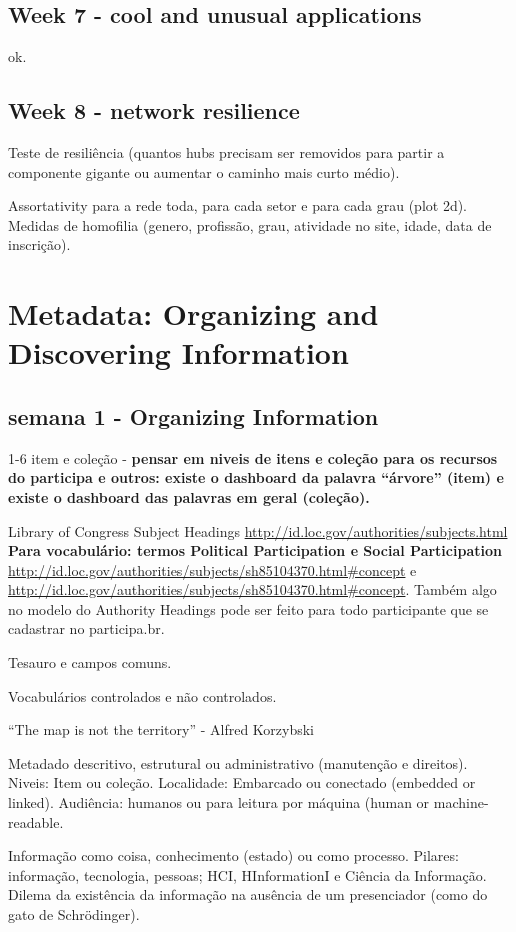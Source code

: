 \documentclass[12pt]{report}
\newcommand{\VV}[1]{{\bf \color{red} #1}}
\begin{document}
\subsection{Week 7 - cool and unusual applications}
ok.
\subsection{Week 8 - network resilience}
Teste de resiliência (quantos hubs precisam ser removidos para partir a componente gigante ou aumentar o caminho mais curto médio).

Assortativity para a rede toda, para cada setor e para cada grau (plot 2d). Medidas de homofilia (genero, profissão, grau, atividade no site, idade, data de inscrição).

\section{Metadata: Organizing and Discovering Information}
\subsection{semana 1 - Organizing Information}

1-6 item e coleção - \VV{pensar em niveis de itens e coleção para os recursos do participa e outros: existe o dashboard da palavra ``árvore'' (item) e existe o dashboard das palavras em geral (coleção).}

Library of Congress Subject Headings \url{http://id.loc.gov/authorities/subjects.html} \VV{Para vocabulário: termos Political Participation e Social Participation} \url{http://id.loc.gov/authorities/subjects/sh85104370.html#concept} e \url{http://id.loc.gov/authorities/subjects/sh85104370.html#concept}. Também algo no modelo do Authority Headings pode ser feito para todo participante que se cadastrar no participa.br.

Tesauro e campos comuns.

Vocabulários controlados e não controlados.

``The map is not the territory'' - Alfred Korzybski

Metadado descritivo, estrutural ou administrativo (manutenção e direitos).
Niveis: Item ou coleção. Localidade: Embarcado ou conectado (embedded or linked). Audiência: humanos ou para leitura por máquina (human or machine-readable.

Informação como coisa, conhecimento (estado) ou como processo.
Pilares: informação, tecnologia, pessoas; HCI, HInformationI e Ciência da Informação. Dilema da existência da informação na ausência de um presenciador (como do gato de Schrödinger).
\end{document}

